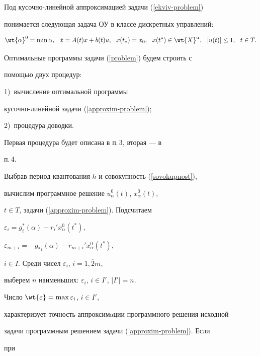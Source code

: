 Под кусочно-линейной аппроксимацией задачи (\ref{ekviv-problem})


понимается следующая задача ОУ в классе дискретных управлений:


\begin{equation}\label{approxim-problem}


\wt{\alpha}^0=\min\alpha,\ \ \Dot{x}=A(t)x+b(t)u,


\ \ x(t_*)=x_0,\ \ x(t^*)\in \wt{X}^\alpha,\ \ |u(t)|\leq1,\ \ t\in T.


\end{equation}





Оптимальные программы задачи (\ref{problem}) будем строить с


помощью двух процедур:





\noindent{}1)~вычисление оптимальной программы


кусочно-линейной задачи (\ref{approxim-problem});


2)~процедура доводки.





\noindent{}Первая процедура будет описана в п.\,3, вторая --- в


п.\,4.





Выбрав период квантования $h$ и совокупность (\ref{sovokupnost}),


вычислим программное решение $u_{\alpha}^0(t)$, $x_{\alpha}^0(t)$,


$t\in T$, задачи (\ref{approxim-problem}). Подсчитаем


$\varepsilon_i=g_i^*(\alpha)-r_i'x_\alpha^0(t^*)$,


$\varepsilon_{m+i}=-{g_*}_i(\alpha)-r_{m+i}'x_\alpha^0(t^*)$,


$i\in I$. Среди чисел $\varepsilon_i$, $i=\overline{1,2m}$,


выберем $n$ наименьших: $\varepsilon_i$, $ i\in I'$, $|I'|=n$.


Число $\wt{\varepsilon}=\max\varepsilon_i$, $i\in I'$,


характеризует точность аппроксимaции программного решения исходной


задачи программным решением задачи (\ref{approxim-problem}). Если


при


